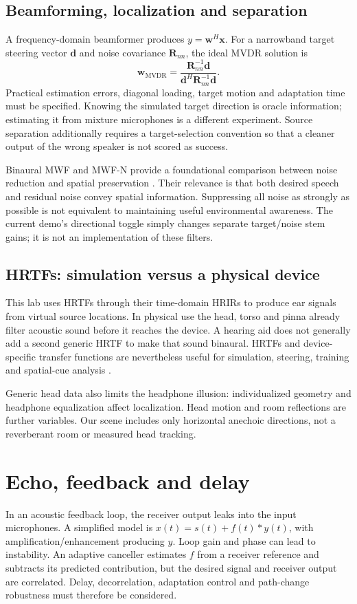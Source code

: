 \documentclass[11pt,a4paper]{article}
\begin{document}
\subsection{Beamforming, localization and separation}
A frequency-domain beamformer produces $y=\mathbf{w}^{H}\mathbf{x}$. For a narrowband target steering vector $\mathbf{d}$ and noise covariance $\mathbf{R}_{nn}$, the ideal MVDR solution is
\begin{equation}
\mathbf{w}_{\mathrm{MVDR}}=\frac{\mathbf{R}_{nn}^{-1}\mathbf{d}}{\mathbf{d}^{H}\mathbf{R}_{nn}^{-1}\mathbf{d}}.
\end{equation}
Practical estimation errors, diagonal loading, target motion and adaptation time must be specified. Knowing the simulated target direction is oracle information; estimating it from mixture microphones is a different experiment. Source separation additionally requires a target-selection convention so that a cleaner output of the wrong speaker is not scored as success.

Binaural MWF and MWF-N provide a foundational comparison between noise reduction and spatial preservation \cite{mwf}. Their relevance is that both desired speech and residual noise convey spatial information. Suppressing all noise as strongly as possible is not equivalent to maintaining useful environmental awareness. The current demo's directional toggle simply changes separate target/noise stem gains; it is not an implementation of these filters.

\subsection{HRTFs: simulation versus a physical device}
This lab uses HRTFs through their time-domain HRIRs to produce ear signals from virtual source locations. In physical use the head, torso and pinna already filter acoustic sound before it reaches the device. A hearing aid does not generally add a second generic HRTF to make that sound binaural. HRTFs and device-specific transfer functions are nevertheless useful for simulation, steering, training and spatial-cue analysis \cite{kemar}.

Generic head data also limits the headphone illusion: individualized geometry and headphone equalization affect localization. Head motion and room reflections are further variables. Our scene includes only horizontal anechoic directions, not a reverberant room or measured head tracking.
\newpage
\section{Echo, feedback and delay}
In an acoustic feedback loop, the receiver output leaks into the input microphones. A simplified model is $x(t)=s(t)+f(t)*y(t)$, with amplification/enhancement producing $y$. Loop gain and phase can lead to instability. An adaptive canceller estimates $f$ from a receiver reference and subtracts its predicted contribution, but the desired signal and receiver output are correlated. Delay, decorrelation, adaptation control and path-change robustness must therefore be considered.
\end{document}
